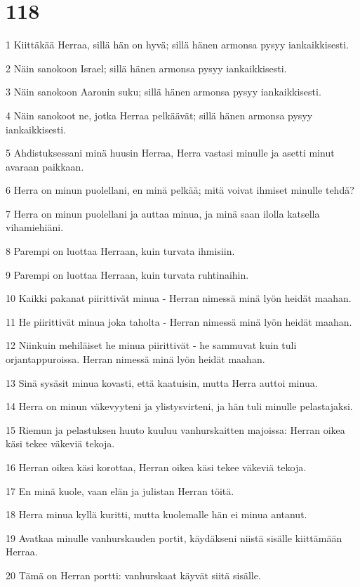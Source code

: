 \chapter{118}

\par 1 Kiittäkää Herraa, sillä hän on hyvä; sillä hänen armonsa pysyy iankaikkisesti.
\par 2 Näin sanokoon Israel; sillä hänen armonsa pysyy iankaikkisesti.
\par 3 Näin sanokoon Aaronin suku; sillä hänen armonsa pysyy iankaikkisesti.
\par 4 Näin sanokoot ne, jotka Herraa pelkäävät; sillä hänen armonsa pysyy iankaikkisesti.
\par 5 Ahdistuksessani minä huusin Herraa, Herra vastasi minulle ja asetti minut avaraan paikkaan.
\par 6 Herra on minun puolellani, en minä pelkää; mitä voivat ihmiset minulle tehdä?
\par 7 Herra on minun puolellani ja auttaa minua, ja minä saan ilolla katsella vihamiehiäni.
\par 8 Parempi on luottaa Herraan, kuin turvata ihmisiin.
\par 9 Parempi on luottaa Herraan, kuin turvata ruhtinaihin.
\par 10 Kaikki pakanat piirittivät minua - Herran nimessä minä lyön heidät maahan.
\par 11 He piirittivät minua joka taholta - Herran nimessä minä lyön heidät maahan.
\par 12 Niinkuin mehiläiset he minua piirittivät - he sammuvat kuin tuli orjantappuroissa. Herran nimessä minä lyön heidät maahan.
\par 13 Sinä sysäsit minua kovasti, että kaatuisin, mutta Herra auttoi minua.
\par 14 Herra on minun väkevyyteni ja ylistysvirteni, ja hän tuli minulle pelastajaksi.
\par 15 Riemun ja pelastuksen huuto kuuluu vanhurskaitten majoissa: Herran oikea käsi tekee väkeviä tekoja.
\par 16 Herran oikea käsi korottaa, Herran oikea käsi tekee väkeviä tekoja.
\par 17 En minä kuole, vaan elän ja julistan Herran töitä.
\par 18 Herra minua kyllä kuritti, mutta kuolemalle hän ei minua antanut.
\par 19 Avatkaa minulle vanhurskauden portit, käydäkseni niistä sisälle kiittämään Herraa.
\par 20 Tämä on Herran portti: vanhurskaat käyvät siitä sisälle.
